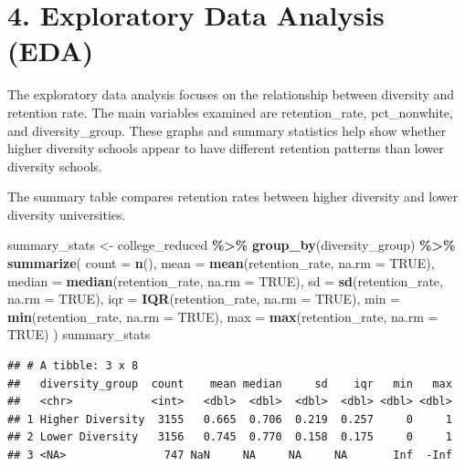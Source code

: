 \documentclass[
]{article}
\newenvironment{Shaded}{\begin{snugshade}}{\end{snugshade}}
\newcommand{\AttributeTok}[1]{\textcolor[rgb]{0.13,0.29,0.53}{#1}}
\newcommand{\ConstantTok}[1]{\textcolor[rgb]{0.56,0.35,0.01}{#1}}
\newcommand{\FunctionTok}[1]{\textcolor[rgb]{0.13,0.29,0.53}{\textbf{#1}}}
\newcommand{\NormalTok}[1]{#1}
\newcommand{\OtherTok}[1]{\textcolor[rgb]{0.56,0.35,0.01}{#1}}
\newcommand{\SpecialCharTok}[1]{\textcolor[rgb]{0.81,0.36,0.00}{\textbf{#1}}}
\begin{document}
\section{4. Exploratory Data Analysis
(EDA)}\label{exploratory-data-analysis-eda}

The exploratory data analysis focuses on the relationship between
diversity and retention rate. The main variables examined are
retention\_rate, pct\_nonwhite, and diversity\_group. These graphs and
summary statistics help show whether higher diversity schools appear to
have different retention patterns than lower diversity schools.

The summary table compares retention rates between higher diversity and
lower diversity universities.

\begin{Shaded}
\begin{Highlighting}[]
\NormalTok{summary\_stats }\OtherTok{\textless{}{-}}\NormalTok{ college\_reduced }\SpecialCharTok{\%\textgreater{}\%}
\FunctionTok{group\_by}\NormalTok{(diversity\_group) }\SpecialCharTok{\%\textgreater{}\%}
\FunctionTok{summarize}\NormalTok{(}
\AttributeTok{count =} \FunctionTok{n}\NormalTok{(),}
\AttributeTok{mean =} \FunctionTok{mean}\NormalTok{(retention\_rate, }\AttributeTok{na.rm =} \ConstantTok{TRUE}\NormalTok{),}
\AttributeTok{median =} \FunctionTok{median}\NormalTok{(retention\_rate, }\AttributeTok{na.rm =} \ConstantTok{TRUE}\NormalTok{),}
\AttributeTok{sd =} \FunctionTok{sd}\NormalTok{(retention\_rate, }\AttributeTok{na.rm =} \ConstantTok{TRUE}\NormalTok{),}
\AttributeTok{iqr =} \FunctionTok{IQR}\NormalTok{(retention\_rate, }\AttributeTok{na.rm =} \ConstantTok{TRUE}\NormalTok{),}
\AttributeTok{min =} \FunctionTok{min}\NormalTok{(retention\_rate, }\AttributeTok{na.rm =} \ConstantTok{TRUE}\NormalTok{),}
\AttributeTok{max =} \FunctionTok{max}\NormalTok{(retention\_rate, }\AttributeTok{na.rm =} \ConstantTok{TRUE}\NormalTok{)}
\NormalTok{)}
\NormalTok{summary\_stats}
\end{Highlighting}
\end{Shaded}

\begin{verbatim}
## # A tibble: 3 x 8
##   diversity_group  count    mean median     sd    iqr   min   max
##   <chr>            <int>   <dbl>  <dbl>  <dbl>  <dbl> <dbl> <dbl>
## 1 Higher Diversity  3155   0.665  0.706  0.219  0.257     0     1
## 2 Lower Diversity   3156   0.745  0.770  0.158  0.175     0     1
## 3 <NA>               747 NaN     NA     NA     NA       Inf  -Inf
\end{verbatim}
\end{document}
